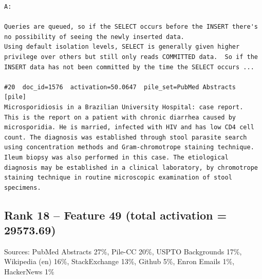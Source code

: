\begin{verbatim}
A:

Queries are queued, so if the SELECT occurs before the INSERT there's no possibility of seeing the newly inserted data.
Using default isolation levels, SELECT is generally given higher privilege over others but still only reads COMMITTED data.  So if the INSERT data has not been committed by the time the SELECT occurs ...

#20  doc_id=1576  activation=50.0647  pile_set=PubMed Abstracts  [pile]
Microsporidiosis in a Brazilian University Hospital: case report.
This is the report on a patient with chronic diarrhea caused by microsporidia. He is married, infected with HIV and has low CD4 cell count. The diagnosis was established through stool parasite search using concentration methods and Gram-chromotrope staining technique. Ileum biopsy was also performed in this case. The etiological diagnosis may be established in a clinical laboratory, by chromotrope staining technique in routine microscopic examination of stool specimens.

\end{verbatim}

\subsection*{Rank 18 -- Feature 49 (total activation = 29573.69)}

Sources: PubMed Abstracts 27\%, Pile-CC 20\%, USPTO Backgrounds 17\%, Wikipedia (en) 16\%, StackExchange 13\%, Github 5\%, Enron Emails 1\%, HackerNews 1\%

